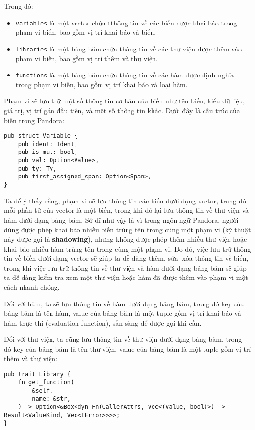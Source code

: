     Trong đó:
    \begin{itemize}
        \item \texttt{variables} là một vector chứa tthông tin về các biến được khai báo trong phạm vi biến, bao gồm vị trí khai báo và biến.
        \item \texttt{libraries} là một bảng băm chứa thông tin về các thư viện được thêm vào phạm vi biến, bao gồm vị trí thêm và thư viện.
        \item \texttt{functions} là một bảng băm chứa thông tin về các hàm được định nghĩa trong phạm vi biến, bao gồm vị trí khai báo và loại hàm.
    \end{itemize}

    Phạm vi sẽ lưu trữ một số thông tin cơ bản của biến như tên biến, kiểu dữ liệu, giá trị, vị trí gán đầu tiên, và một số thông tin khác. Dưới đây là cấu trúc của biến trong Pandora:

\begin{lstlisting}[]
pub struct Variable {
    pub ident: Ident,
    pub is_mut: bool,
    pub val: Option<Value>,
    pub ty: Ty,
    pub first_assigned_span: Option<Span>,
}
\end{lstlisting}

    Ta để ý thấy rằng, phạm vi sẽ lưu thông tin các biến dưới dạng vector, trong đó mỗi phần tử của vector là một biến, trong khi đó lại lưu thông tin về thư viện và hàm dưới dạng bảng băm. Sở dĩ như vậy là vì trong ngôn ngữ Pandora, người dùng được phép khai báo nhiều biến trùng tên trong cùng một phạm vi (kỹ thuật này được gọi là \textbf{shadowing}), nhưng không được phép thêm nhiều thư viện hoặc khai báo nhiều hàm trùng tên trong cùng một phạm vi. Do đó, việc lưu trữ thông tin về biến dưới dạng vector sẽ giúp ta dễ dàng thêm, sửa, xóa thông tin về biến, trong khi việc lưu trữ thông tin về thư viện và hàm dưới dạng bảng băm sẽ giúp ta dễ dàng kiểm tra xem một thư viện hoặc hàm đã được thêm vào phạm vi một cách nhanh chóng.

    Đối với hàm, ta sẽ lưu thông tin về hàm dưới dạng bảng băm, trong đó key của bảng băm là tên hàm, value của bảng băm là một tuple gồm vị trí khai báo và hàm thực thi (evaluation function), sẵn sàng để được gọi khi cần.  

    Đối với thư viện, ta cũng lưu thông tin về thư viện dưới dạng bảng băm, trong đó key của bảng băm là tên thư viện, value của bảng băm là một tuple gồm vị trí thêm và thư viện:

\begin{lstlisting}[]
pub trait Library {
    fn get_function(
        &self,
        name: &str,
    ) -> Option<&Box<dyn Fn(CallerAttrs, Vec<(Value, bool)>) -> Result<ValueKind, Vec<IError>>>>;
}
\end{lstlisting}

